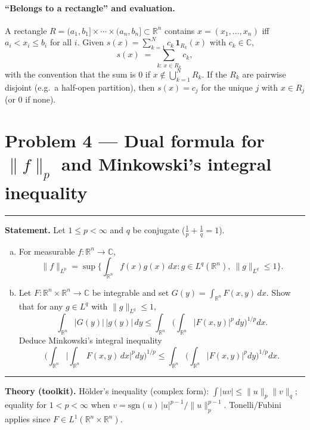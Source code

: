 \documentclass[12pt,a4paper]{article}
\theoremstyle{plain}
\theoremstyle{definition}
\theoremstyle{remark}
\theoremstyle{remark}
\newcommand{\tighthrule}{\vspace{0.6\baselineskip}\hrule\vspace{0.8\baselineskip}}
\newenvironment{spacy}{\begingroup\setlength{\parskip}{6pt}\setlength{\parindent}{0pt}}{\endgroup}
\theoremstyle{definition}
\begin{document}
\paragraph{“Belongs to a rectangle” and evaluation.}
A rectangle $R=(a_1,b_1]\times\cdots\times(a_n,b_n]\subset\mathbb R^n$
contains $x=(x_1,\dots,x_n)$ iff $a_i < x_i \le b_i$ for all $i$.
Given $s(x)=\sum_{k=1}^N c_k\,\mathbf 1_{R_k}(x)$ with $c_k\in\mathbb C$,
\[
s(x) \;=\; \sum_{k:\,x\in R_k} c_k,
\]
with the convention that the sum is $0$ if $x\notin\bigcup_{k=1}^N R_k$.
If the $R_k$ are pairwise disjoint (e.g.\ a half-open partition), then
$s(x)=c_j$ for the unique $j$ with $x\in R_j$ (or $0$ if none).

\section*{Problem 4 — Dual formula for $\|f\|_{p}$ and Minkowski’s integral inequality}

\tighthrule
\begin{spacy}
	\textbf{Statement.} Let $1\le p<\infty$ and $q$ be conjugate ($\tfrac1p+\tfrac1q=1$).
	\begin{enumerate}[(a)]
		\item For measurable $f:\mathbb R^{n}\to\mathbb C$,
		\[
		\|f\|_{L^{p}}
		= \sup\Big\{ \int_{\mathbb R^{n}} f(x)g(x)\,dx : g\in L^{q}(\mathbb R^{n}),\ \|g\|_{L^{q}}\le1 \Big\}.
		\]
		\item Let $F:\mathbb R^{n}\times\mathbb R^{n}\to\mathbb C$ be integrable and set
		$G(y)=\int_{\mathbb R^{n}} F(x,y)\,dx$.
		Show that for any $g\in L^{q}$ with $\|g\|_{L^{q}}\le1$,
		\[
		\int_{\mathbb R^{n}} |G(y)|\,|g(y)|\,dy
		\le \int_{\mathbb R^{n}} \Big(\int_{\mathbb R^{n}} |F(x,y)|^{p}\,dy\Big)^{1/p} dx.
		\]
		Deduce Minkowski’s integral inequality
		\[
		\Bigg(\int_{\mathbb R^{n}} \Big|\int_{\mathbb R^{n}} F(x,y)\,dx\Big|^{p} dy\Bigg)^{\!1/p}
		\le \int_{\mathbb R^{n}} \Big(\int_{\mathbb R^{n}} |F(x,y)|^{p} dy\Big)^{1/p} dx.
		\]
	\end{enumerate}
\end{spacy}

\tighthrule
\begin{spacy}
	\textbf{Theory (toolkit).}
	Hölder’s inequality (complex form):
	$\int |uv|\le \|u\|_{p}\|v\|_{q}$; equality for $1<p<\infty$ when $v=\mathrm{sgn}(u)\,|u|^{p-1}/\|u\|_{p}^{p-1}$.
	Tonelli/Fubini applies since $F\in L^{1}(\mathbb R^{n}\times\mathbb R^{n})$.
\end{spacy}
\end{document}
